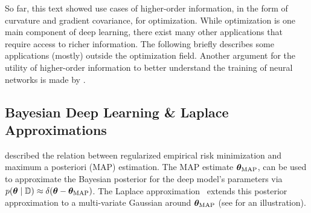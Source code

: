 So far, this text showed use cases of higher-order information, in the form of
curvature and gradient covariance, for optimization. While optimization is one
main component of deep learning, there exist many other applications that
require access to richer information. The following briefly describes some
applications (mostly) outside the optimization field. Another argument for the
utility of higher-order information to better understand the training of neural
networks is made by .

\subsection{Bayesian Deep Learning \& Laplace
  Approximations}\label{sec:background::LaplaceApproximation}

 described the relation
between regularized empirical risk minimization and maximum a posteriori (MAP)
estimation. The MAP estimate ${\bm{\theta}}_{\text{MAP}}$, can be used to approximate
the Bayesian posterior for the deep model's parameters via
$p({\bm{\theta}}\;|\;{\mathbb{D}}) \approx \delta({\bm{\theta}} - {\bm{\theta}}_{\text{MAP}})$.
The Laplace approximation~\cite{laplace1774memoire} extends this posterior
approximation to a multi-variate Gaussian around ${\bm{\theta}}_{\text{MAP}}$ (see
 for an illustration).


